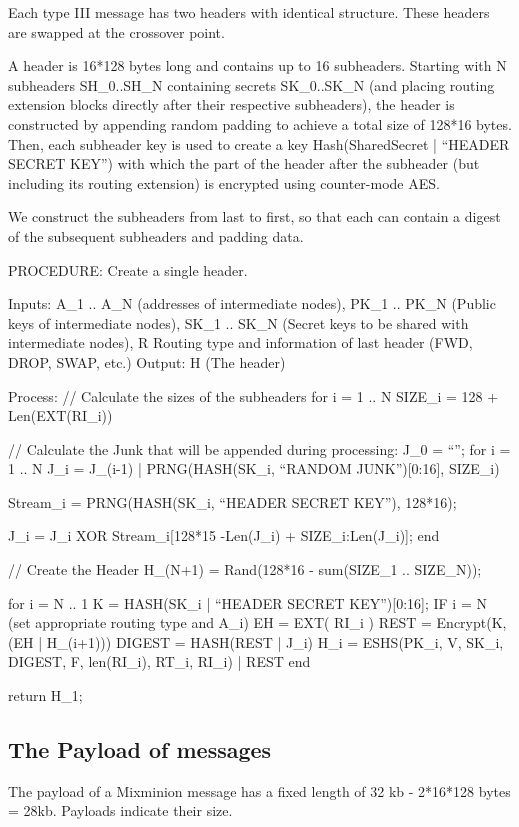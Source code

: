 Each type III message has two headers with identical structure. These
headers are swapped at the crossover point.

A header is 16*128 bytes long and contains up to 16
subheaders. Starting with N subheaders SH_0..SH_N containing secrets
SK_0..SK_N (and placing routing extension blocks directly after their
respective subheaders), the header is constructed by appending 
random padding to achieve a total size
of 128*16 bytes. Then, each subheader key is used to create a key
Hash(SharedSecret | ``HEADER SECRET KEY'') with which the part of the
header after the subheader (but including its routing extension) is
encrypted using counter-mode AES.

We construct the subheaders from last to first, so that each can contain
a digest of the subsequent subheaders and padding data.

PROCEDURE: Create a single header.

Inputs: A_1 .. A_N (addresses of intermediate nodes), 
	PK_1 .. PK_N (Public keys of intermediate nodes),
	SK_1 .. SK_N (Secret keys to be shared with intermediate nodes),
        R Routing type and information of last header (FWD, DROP, SWAP, etc.)
Output: H (The header)

Process: 
  // Calculate the sizes of the subheaders
  for i = 1 .. N
	SIZE_i = 128 + Len(EXT(RI_i))

  // Calculate the Junk that will be appended during processing:
  J_0 = ``'';
  for i = 1 .. N
	J_i = J_(i-1) | PRNG(HASH(SK_i, ``RANDOM JUNK'')[0:16], SIZE_i)

        Stream_i = PRNG(HASH(SK_i, ``HEADER SECRET KEY''), 128*16);

	J_i = J_i XOR Stream_i[128*15 -Len(J_i) + SIZE_i:Len(J_i)];
  end

  // Create the Header
  H_(N+1) = Rand(128*16 - sum(SIZE_1 .. SIZE_N));

  for i = N .. 1
	K = HASH(SK_i | ``HEADER SECRET KEY'')[0:16];
	IF i = N (set appropriate routing type and A_i)
	EH = EXT( RI_i )
        REST = Encrypt(K, (EH | H_(i+1)))
  	DIGEST = HASH(REST | J_i)
	H_i = ESHS(PK_i, V, SK_i, DIGEST, F, len(RI_i), RT_i, RI_i) | REST
  end

return H_1;

\subsection{The Payload of messages}

The payload of a Mixminion message has a fixed length of 32 kb
- 2*16*128 bytes = 28kb.   Payloads indicate their size.

